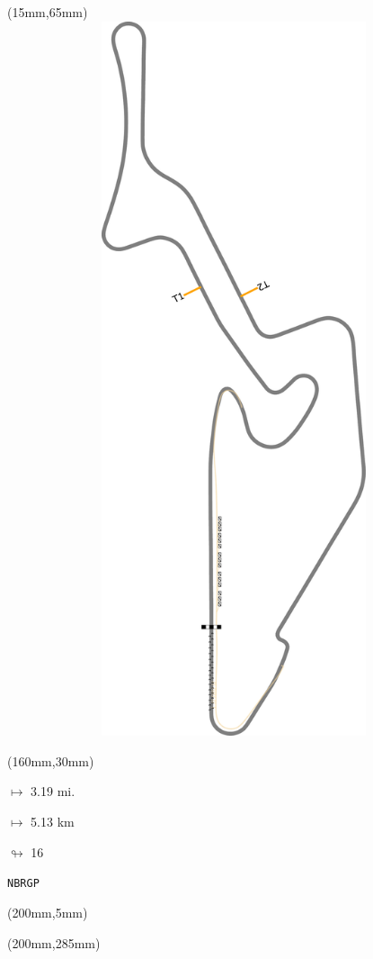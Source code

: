 \begin{textblock*}{185mm}(15mm,65mm)%
\centering
\mbox{\includegraphics[width=185mm,height=210mm,keepaspectratio]{PT/NBRGP.pdf}}
\end{textblock*}
\begin{textblock*}{40mm}(160mm,30mm)%
\Large
\par$\mapsto$ 3.19 mi.
\par$\mapsto$ 5.13 km
\par$\looparrowright$ 16
\par\hfill\tiny\tt NBRGP\\
\end{textblock*}
\begin{textblock*}{20mm}(200mm,5mm)%
\fbox{\thepage}
\label{NBRGP}
\end{textblock*}
\begin{textblock*}{20mm}(200mm,285mm)%
\fbox{\thepage}
\end{textblock*}

